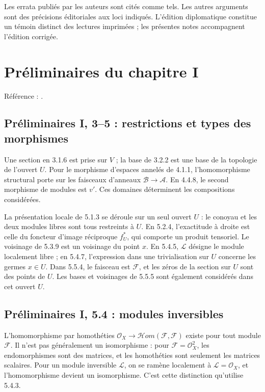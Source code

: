 \documentclass[11pt,a4paper]{article}
\begin{document}
Les errata publiés par les auteurs sont cités comme tels.
Les autres arguments sont des précisions éditoriales aux loci indiqués.
L'édition diplomatique constitue un témoin distinct des lectures
imprimées ; les présentes notes accompagnent l'édition corrigée.
\tableofcontents
\clearpage
\section{Préliminaires du chapitre I}
\label{part:base0}
Référence : \cite{EGAI}.
\subsection{Préliminaires I, 3--5 : restrictions et types des morphismes}
\label{note:base0-sheaves}
Une section en 3.1.6 est prise sur $V$ ; la base de 3.2.2 est une base
de la topologie de l'ouvert $U$. Pour le morphisme d'espaces annelés de
4.1.1, l'homomorphisme structural porte sur les faisceaux d'anneaux
$\mathcal B\to\mathcal A$. En 4.4.8, le second morphisme de modules
est $v'$. Ces domaines déterminent les compositions considérées.

La présentation locale de 5.1.3 se déroule sur un seul ouvert $U$ :
le conoyau et les deux modules libres sont tous restreints à $U$.
En 5.2.4, l'exactitude à droite est celle du foncteur d'image réciproque
$f_U^*$, qui comporte un produit tensoriel. Le voisinage de 5.3.9
est un voisinage du point $x$.
En 5.4.5, $\mathcal L$ désigne le module localement libre ; en 5.4.7,
l'expression dans une trivialisation sur $U$ concerne les germes $x\in U$.
Dans 5.5.4, le faisceau est $\mathcal F$, et les zéros de la section sur
$U$ sont des points de $U$. Les bases et voisinages de 5.5.5 sont
également considérés dans cet ouvert $U$.

\subsection{Préliminaires I, 5.4 : modules inversibles}
\label{note:base0-invertible}
L'homomorphisme par homothéties
$\mathcal O_X\to\mathcal H\!om(\mathcal F,\mathcal F)$ existe pour
tout module $\mathcal F$. Il n'est pas généralement un isomorphisme :
pour $\mathcal F=\mathcal O_X^2$, les endomorphismes sont des matrices,
et les homothéties sont seulement les matrices scalaires.
Pour un module inversible $\mathcal L$, on se ramène localement à
$\mathcal L=\mathcal O_X$, et l'homomorphisme devient un isomorphisme.
C'est cette distinction qu'utilise 5.4.3.
\end{document}
